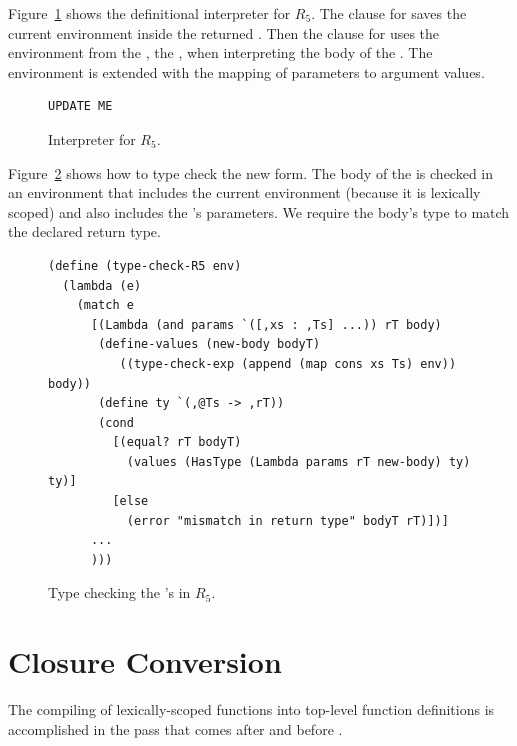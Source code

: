 \documentclass[11pt]{book}
\begin{document}
\label{sec:interp-R5}

Figure~\ref{fig:interp-R5} shows the definitional interpreter for
$R_5$. The clause for  saves the current environment
inside the returned . Then the clause for  uses
the environment from the , the , when
interpreting the body of the .  The 
environment is extended with the mapping of parameters to argument
values.

\begin{figure}[tbp]
\begin{lstlisting}
UPDATE ME
\end{lstlisting}
\caption{Interpreter for $R_5$.}
\label{fig:interp-R5}
\end{figure}


\label{sec:type-check-r5}

Figure~\ref{fig:type-check-R5} shows how to type check the new
 form. The body of the  is checked in an
environment that includes the current environment (because it is
lexically scoped) and also includes the 's parameters.  We
require the body's type to match the declared return type.

\begin{figure}[tbp]
\begin{lstlisting}
(define (type-check-R5 env)
  (lambda (e)
    (match e
      [(Lambda (and params `([,xs : ,Ts] ...)) rT body)
       (define-values (new-body bodyT) 
          ((type-check-exp (append (map cons xs Ts) env)) body))
       (define ty `(,@Ts -> ,rT))
       (cond
         [(equal? rT bodyT)
           (values (HasType (Lambda params rT new-body) ty) ty)]
         [else
           (error "mismatch in return type" bodyT rT)])]
      ...
      )))
\end{lstlisting}
\caption{Type checking the 's in $R_5$.}
\label{fig:type-check-R5}
\end{figure}


\section{Closure Conversion}
\label{sec:closure-conversion}

The compiling of lexically-scoped functions into top-level function
definitions is accomplished in the pass 
that comes after  and before
. 
\end{document}
